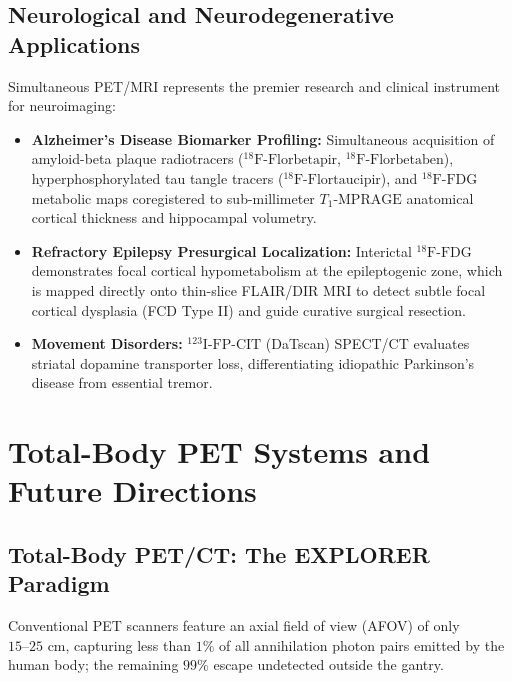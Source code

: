 \documentclass[11pt,a4paper]{article}
\begin{document}
\subsection{Neurological and Neurodegenerative Applications}
Simultaneous PET/MRI represents the premier research and clinical instrument for neuroimaging:
\begin{itemize}[leftmargin=2em]
    \item \textbf{Alzheimer's Disease Biomarker Profiling:} Simultaneous acquisition of amyloid-beta plaque radiotracers ($^{18}\text{F}\text{-Florbetapir}$, $^{18}\text{F}\text{-Florbetaben}$), hyperphosphorylated tau tangle tracers ($^{18}\text{F}\text{-Flortaucipir}$), and $^{18}\text{F}\text{-FDG}$ metabolic maps coregistered to sub-millimeter $T_1\text{-MPRAGE}$ anatomical cortical thickness and hippocampal volumetry.
    \item \textbf{Refractory Epilepsy Presurgical Localization:} Interictal $^{18}\text{F}\text{-FDG}$ demonstrates focal cortical hypometabolism at the epileptogenic zone, which is mapped directly onto thin-slice FLAIR/DIR MRI to detect subtle focal cortical dysplasia (FCD Type II) and guide curative surgical resection.
    \item \textbf{Movement Disorders:} $^{123}\text{I}\text{-FP-CIT}$ (DaTscan) SPECT/CT evaluates striatal dopamine transporter loss, differentiating idiopathic Parkinson's disease from essential tremor.
\end{itemize}

\section{Total-Body PET Systems and Future Directions}

\subsection{Total-Body PET/CT: The EXPLORER Paradigm}
Conventional PET scanners feature an axial field of view (AFOV) of only $15\text{--}25\text{ cm}$, capturing less than $1\%$ of all annihilation photon pairs emitted by the human body; the remaining $99\%$ escape undetected outside the gantry. 
\end{document}
